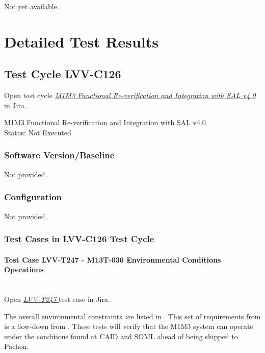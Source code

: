 \documentclass[SE,lsstdraft,STR,toc]{lsstdoc}
\begin{document}
Not yet available.

\newpage
\section{Detailed Test Results}
\label{sect:detailedtestresults}

\subsection{Test Cycle LVV-C126 }

Open test cycle {\it \href{https://jira.lsstcorp.org/secure/Tests.jspa#/testrun/LVV-C126}{M1M3 Functional Re-verification and Integration with SAL v4.0}} in Jira.

M1M3 Functional Re-verification and Integration with SAL v4.0\\
Status: Not Executed



\subsubsection{Software Version/Baseline}
Not provided.

\subsubsection{Configuration}
Not provided.

\subsubsection{Test Cases in LVV-C126 Test Cycle}

\paragraph{Test Case LVV-T247 - M13T-036 Environmental Conditions Operations }\mbox{}\\

Open  \href{https://jira.lsstcorp.org/secure/Tests.jspa#/testCase/LVV-T247}{\textit{ LVV-T247 } }
test case in Jira.

The overall environmental constraints are listed in . This set of
requirements from  is a flow-down from . These tests will
verify that the M1M3 system can operate under the conditions found at
CAID and SOML ahead of being shipped to Pachon.
\end{document}
